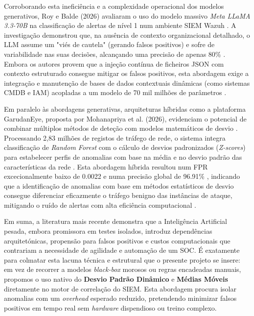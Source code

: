 \documentclass[12pt,a4paper]{article}
\begin{document}
Corroborando esta ineficiência e a complexidade operacional dos modelos generativos, Roy e Balde (2026) avaliaram o uso do modelo massivo \textit{Meta LLaMA 3.3-70B} na classificação de alertas de nível 1 num ambiente SIEM Wazuh \cite{roy2026}. A investigação demonstrou que, na ausência de contexto organizacional detalhado, o LLM assume um "viés de cautela" (gerando falsos positivos) e sofre de variabilidade nas suas decisões, alcançando uma precisão de apenas 80\% \cite{roy2026}. Embora os autores provem que a injeção contínua de ficheiros JSON com contexto estruturado consegue mitigar os falsos positivos, esta abordagem exige a integração e manutenção de bases de dados contextuais dinâmicas (como sistemas CMDB e IAM) acopladas a um modelo de 70 mil milhões de parâmetros \cite{roy2026}. 

Em paralelo às abordagens generativas, arquiteturas híbridas como a plataforma GarudanEye, proposta por Mohanapriya et al. (2026), evidenciam o potencial de combinar múltiplos métodos de deteção com modelos matemáticos de desvio \cite{mohanapriya2026}. Processando 2,83 milhões de registos de tráfego de rede, o sistema integra classificação de \textit{Random Forest} com o cálculo de desvios padronizados (\textit{Z-scores}) para estabelecer perfis de anomalias com base na média e no desvio padrão das características da rede \cite{mohanapriya2026}. Esta abordagem híbrida resultou num FPR excecionalmente baixo de 0.0022 e numa precisão global de 96.91\% \cite{mohanapriya2026}, indicando que a identificação de anomalias com base em métodos estatísticos de desvio consegue diferenciar eficazmente o tráfego benigno das instâncias de ataque, mitigando o ruído de alertas com alta eficiência computacional \cite{mohanapriya2026}.

Em suma, a literatura mais recente demonstra que a Inteligência Artificial pesada, embora promissora em testes isolados, introduz dependências arquitetónicas, propensão para falsos positivos e custos computacionais que contrariam a necessidade de agilidade e automação de um SOC. É exatamente para colmatar esta lacuna técnica e estrutural que o presente projeto se insere: em vez de recorrer a modelos \textit{black-box} morosos ou regras encadeadas manuais, propomos o uso nativo do \textbf{Desvio Padrão Dinâmico} e \textbf{Médias Móveis} diretamente no motor de correlação do SIEM. Esta abordagem procura isolar anomalias com um \textit{overhead} esperado reduzido, pretendendo minimizar falsos positivos em tempo real sem \textit{hardware} dispendioso ou treino complexo.
\end{document}
